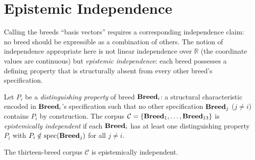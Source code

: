 \section{Epistemic Independence}
\label{sec:epistemic-independence}

Calling the breeds ``basis vectors'' requires a corresponding independence claim: no breed
should be expressible as a combination of others. The notion of independence appropriate
here is not linear independence over $\mathbb{R}$ (the coordinate values are continuous)
but \emph{epistemic independence}: each breed possesses a defining property that is
structurally absent from every other breed's specification.

\begin{definition}
\label{def:epistemic-independence}
Let $P_i$ be a \emph{distinguishing property} of breed $\mathbf{Breed}_i$: a structural
characteristic encoded in $\mathbf{Breed}_i$'s specification such that no other specification
$\mathbf{Breed}_j$ ($j \neq i$) contains $P_i$ by construction. The corpus
$\mathcal{C} = \{\mathbf{Breed}_1, \ldots, \mathbf{Breed}_{13}\}$ is \emph{epistemically independent} if
each $\mathbf{Breed}_i$ has at least one distinguishing property $P_i$ with
$P_i \notin \mathrm{spec}(\mathbf{Breed}_j)$ for all $j \neq i$.
\end{definition}

\begin{theorem}
\label{thm:epistemic-independence}
The thirteen-breed corpus $\mathcal{C}$ is epistemically independent.
\end{theorem}

